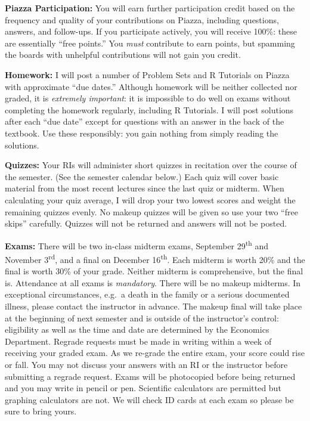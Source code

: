 \documentclass[11pt, letterpaper]{article}
\begin{document}
\medskip

\noindent \textbf{Piazza Participation:} 
You will earn further participation credit based on the frequency and quality of your contributions on Piazza, including questions, answers, and follow-ups. 
If you participate actively, you will receive 100\%: these are essentially ``free points.''  
You \emph{must} contribute to earn points, but spamming the boards with unhelpful contributions will not gain you credit.  


\medskip



\noindent \textbf{Homework:} 
I will post a number of Problem Sets and R Tutorials on Piazza with approximate ``due dates.'' 
Although homework will be neither collected nor graded, it is \emph{extremely important}: it is impossible to do well on exams without completing the homework regularly, including R Tutorials. 
I will post solutions after each ``due date'' except for questions with an answer in the back of the textbook. 
Use these responsibly: you gain nothing from simply reading the solutions.


\medskip

\noindent \textbf{Quizzes:} 
Your RIs will administer  short quizzes in recitation over the course of the semester. 
(See the semester calendar below.) 
Each quiz will cover basic material from the most recent lectures since the last quiz or midterm. 
When calculating your quiz average, I will drop your two lowest scores and weight the remaining quizzes evenly. 
No makeup quizzes will be given so use your two ``free skips'' carefully.
Quizzes will not be returned and answers will not be posted.

\medskip

\noindent \textbf{Exams:} 
There will be two in-class midterm exams, September 29\textsuperscript{th} and November 3\textsuperscript{rd}, and a final on December 16\textsuperscript{th}.
Each midterm is worth 20\% and the final is worth 30\% of your grade.
Neither midterm is comprehensive, but the final is.  
Attendance at all exams is \emph{mandatory}.
There will be no makeup midterms. 
In exceptional circumstances, e.g.\ a death in the family or a serious documented illness, please contact the instructor in advance. 
The makeup final will take place at the beginning of next semester and is outside of the instructor's control: eligibility as well as the time and date are determined by the Economics Department. 
Regrade requests must be made in writing within a week of receiving your graded exam. 
As we re-grade the entire exam, your score could rise or fall. 
You may not discuss your answers with an RI or the instructor before submitting a regrade request. 
Exams will be photocopied before being returned and you may write in pencil or pen. 
Scientific calculators are permitted but graphing calculators are not. 
We will check ID cards at each exam so please be sure to bring yours. 
\end{document}
